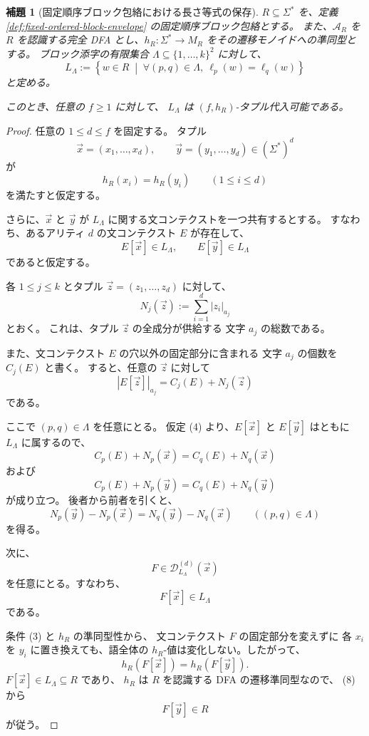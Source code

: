 \documentclass[11pt,a4paper]{ltjsarticle}
\newtheorem{lemma}[theorem]{補題}
\theoremstyle{remark}
\newcommand{\D}{\mathcal{D}}
\newcommand{\tuple}[1]{\vec{#1}}
\begin{document}
\begin{lemma}[固定順序ブロック包絡における長さ等式の保存]
\label{lem:block-equality-envelopes}
\(R\subseteq\Sigma^*\) を、定義
\ref{def:fixed-ordered-block-envelope}
の固定順序ブロック包絡とする。
また、\(\mathcal A_R\) を \(R\) を認識する完全 DFA とし、\(h_R:\Sigma^*\longrightarrow M_R\)
をその遷移モノイドへの準同型とする。
ブロック添字の有限集合 \(\Lambda\subseteq\{1,\ldots,k\}^2\)
に対して、
\[
  L_\Lambda
  :=
  \left\{
    w\in R
    \;\middle|\;
    \forall (p,q)\in\Lambda,\ 
    \ell_p(w)=\ell_q(w)
  \right\}
\]
と定める。

このとき、任意の \(f\ge1\) に対して、
\(L_\Lambda\) は \((f,h_R)\)-タプル代入可能である。
\end{lemma}

\begin{proof}
任意の \(1\le d\le f\) を固定する。
タプル
\[
  \tuple x=(x_1,\ldots,x_d),
  \qquad
  \tuple y=(y_1,\ldots,y_d)
  \in(\Sigma^*)^d
\]
が
\[
  h_R(x_i)=h_R(y_i)
  \qquad(1\le i\le d)
  \tag{3}
\]
を満たすと仮定する。

さらに、\(\tuple x\) と \(\tuple y\) が
\(L_\Lambda\) に関する文コンテクストを一つ共有するとする。
すなわち、あるアリティ \(d\) の文コンテクスト \(E\) が存在して、
\[
  E[\tuple x]\in L_\Lambda,
  \qquad
  E[\tuple y]\in L_\Lambda
  \tag{4}
\]
であると仮定する。

各 \(1\le j\le k\) とタプル
\(\tuple z=(z_1,\ldots,z_d)\) に対して、
\[
  N_j(\tuple z)
  :=
  \sum_{i=1}^d |z_i|_{a_j}
\]
とおく。
これは、タプル \(\tuple z\) の全成分が供給する
文字 \(a_j\) の総数である。

また、文コンテクスト \(E\) の穴以外の固定部分に含まれる
文字 \(a_j\) の個数を \(C_j(E)\) と書く。
すると、任意の \(\tuple z\) に対して
\[
  |E[\tuple z]|_{a_j}
  =
  C_j(E)+N_j(\tuple z)
  \tag{5}
\]
である。

ここで \((p,q)\in\Lambda\) を任意にとる。
仮定 (4) より、\(E[\tuple x]\) と \(E[\tuple y]\) はともに
\(L_\Lambda\) に属するので、
\[
  C_p(E)+N_p(\tuple x)
  =
  C_q(E)+N_q(\tuple x)
\]
および
\[
  C_p(E)+N_p(\tuple y)
  =
  C_q(E)+N_q(\tuple y)
\]
が成り立つ。
後者から前者を引くと、
\[
  N_p(\tuple y)-N_p(\tuple x)
  =
  N_q(\tuple y)-N_q(\tuple x)
  \qquad
  ((p,q)\in\Lambda)
  \tag{6}
\]
を得る。

次に、
\[
  F\in\D_{L_\Lambda}^{(d)}(\tuple x)
\]
を任意にとる。すなわち、
\[
  F[\tuple x]\in L_\Lambda
  \tag{7}
\]
である。

条件 (3) と \(h_R\) の準同型性から、
文コンテクスト \(F\) の固定部分を変えずに
各 \(x_i\) を \(y_i\) に置き換えても、語全体の
\(h_R\)-値は変化しない。したがって、
\[
  h_R(F[\tuple x])
  =
  h_R(F[\tuple y]).
  \tag{8}
\]
\(F[\tuple x]\in L_\Lambda\subseteq R\) であり、
\(h_R\) は \(R\) を認識する DFA の遷移準同型なので、
(8) から
\[
  F[\tuple y]\in R
  \tag{9}
\]
が従う。


\end{proof}
\end{document}
